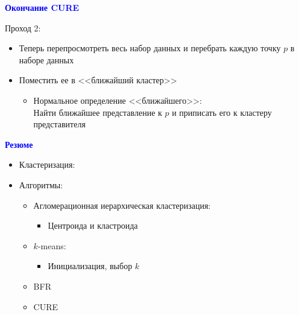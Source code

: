 \documentclass[landscape]{slides}
\begin{document}
\begin{normalsize}
\begin{slide}
\textbf{\textcolor{blue}{Окончание CURE}}

Проход 2:

\begin{itemize}
\item Теперь перепросмотреть весь набор данных и перебрать
каждую точку $p$ в наборе данных
\item Поместить ее в <<ближайший кластер>>
  \begin{itemize}
  \item Нормальное определение <<ближайшего>>:\\
  Найти ближайшее представление к $p$ и приписать его к кластеру представителя
  \end{itemize}
\end{itemize}
\end{slide}



\begin{slide}
\textbf{\textcolor{blue}{Резюме}}

\begin{itemize}
\item Кластеризация: 
\item Алгоритмы:
  \begin{itemize}
  \item Агломерационная иерархическая кластеризация:
    \begin{itemize}
    \item Центроида и кластроида
    \end{itemize}
  \item $k$-means:
    \begin{itemize}
    \item Инициализация, выбор $k$
    \end{itemize}
  \item BFR
  \item CURE
  \end{itemize}
\end{itemize}
\end{slide}



\end{normalsize}
\end{document}
